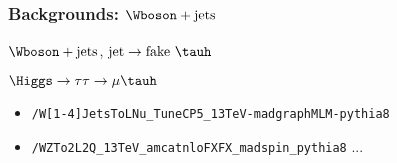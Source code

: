 \begin{frame}\addtocounter{framenumber}{-1}
\frametitle{Backgrounds: $\Wboson+\text{jets}$}


\begin{minipage}[c]{.45\textwidth}
\begin{block}{$\Wboson+\text{jets}$, $\text{jet}\to\text{fake \tauh}$\vphantom{ÀQj}}
\begin{center}
\end{center}
\end{block}
\end{minipage}
\hfill
\begin{minipage}[c]{.45\textwidth}
\begin{block}{$\Higgs\to\tau\tau\to\mu\tauh$\vphantom{ÀQj}}
\begin{center}
\end{center}
\end{block}
\end{minipage}

\begin{block}{}
\begin{itemize}
\item \texttt{/W[1-4]JetsToLNu\_TuneCP5\_13TeV-madgraphMLM-pythia8}
\item \texttt{/WZTo2L2Q\_13TeV\_amcatnloFXFX\_madspin\_pythia8} ...
\end{itemize}
\end{block}

\end{frame}